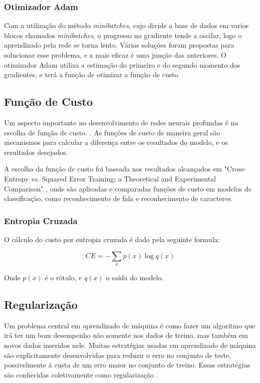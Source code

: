 \documentclass[12pt]{article}
\begin{document}
\subsubsection{Otimizador Adam}

Com a utilização do método \textit{minibatches}, cujo divide a base de dados em varios blocos chamados \textit{minibatches}, o progresso no gradiente tende a oscilar, logo o aprendizado pela rede se torna lento. Várias soluções foram propostas para solucionar esse problema, e a mais eficaz é uma junção das anteriores. O otimizador Adam \cite{DBLP:journals/corr/KingmaB14} utiliza a estimação do primeiro e do segundo momento dos gradientes, e terá a função de otimizar a função de custo.

\subsection{Função de Custo}

Um aspecto importante no desenvolvimento de redes neurais profundas é na escolha de função de custo. \cite{Goodfellow-et-al-2016}. As funções de custo de maneira geral são mecanismos para calcular a diferença entre os resultados do modelo, e os resultados desejados.

A escolha da função de custo foi baseada nos resultados alcançados em "Cross-Entropy vs. Squared Error Training: a Theoretical and Experimental Comparison" \cite{golik:2013}, onde são aplicadas e comparadas funções de custo em modelos de classificação, como reconhecimento de fala e reconhecimento de caracteres.

\subsubsection{Entropia Cruzada}

O cálculo do custo por entropia cruzada é dado pela seguinte formula:

\begin{equation}
    CE = -\sum\limits_{x} p(x)\log q(x)
\end{equation}

Onde $p(x)$ é o rótulo, e $q(x)$ o saída do modelo.
\subsection{Regularização}

Um problema central em aprendizado de máquina é como fazer um algoritmo que irá ter um bom desempenho não somente nos dados de treino, mas também em novos dados inseridos nele. Muitas estratégias usadas em aprendizado de máquina são explicitamente desenvolvidas para reduzir o erro no conjunto de teste, possivelmente à custa de um erro maior no conjunto de treino. Essas estratégias são conhecidas coletivamente como regularização \cite{Goodfellow-et-al-2016}.
\end{document}
